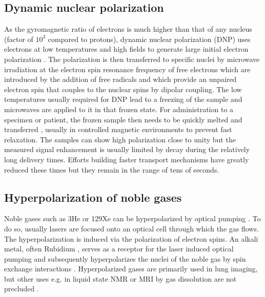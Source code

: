         \subsection{Dynamic nuclear polarization}
        As the gyromagnetic ratio of electrons is much higher than that of any nucleus (factor of $10^{3}$ compared to protons), dynamic nuclear polarization (DNP) uses electrons at low temperatures and high fields to generate large initial electron polarization \cite{berliner_spin_1976}. The polarization is then transferred to specific nuclei by microwave irradiation at the electron spin resonance frequency \cite{bajaj_dynamic_2011} of free electrons which are introduced by the addition of free radicals and which provide an unpaired electron spin that couples to the nuclear spins by dipolar coupling. The low temperatures usually required for DNP lead to a freezing of the sample and microwaves are applied to it in that frozen state. For administration to a specimen or patient, the frozen sample then needs to be quickly melted and transferred \cite{johannesson_dynamic_2009}, usually in controlled magnetic environments \cite{milani_magnetic_2015} to prevent fast relaxation. The samples can show high polarization close to unity but the measured signal enhancement is usually limited by decay during the relatively long delivery times. Efforts building faster transport mechanisms have greatly reduced these times but they remain in the range of tens of seconds.
        \subsection{Hyperpolarization of noble gases}
        Noble gases such as 3He or 129Xe can be hyperpolarized by optical pumping \cite{middleton_mr_1995,oros_hyperpolarized_2004}. To do so, usually lasers are focused onto an optical cell through which the gas flows. The hyperpolarization is induced via the polarization of electron spins. An alkali metal, often Rubidium \cite{hersman_large_2008}, serves as a receptor for the laser induced optical pumping and subsequently hyperpolarizes the nuclei of the noble gas by spin exchange interactions \cite{walker_spin-exchange_1997}. Hyperpolarized gases are primarily used in lung imaging, but other uses e.g. in liquid state NMR or MRI by gas dissolution are not precluded \cite{duhamel_xenon-129_2001}.
